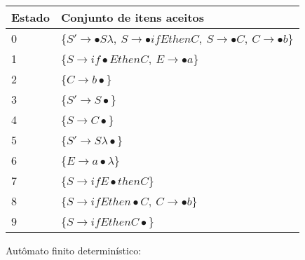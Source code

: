 \documentclass{article}
\begin{document}
\begin{table}[h]
\begin{tabular}{|l|l|}
\hline
Estado & Conjunto de itens aceitos \\ \hline
0 &   \{$S' \rightarrow \bullet S \lambda,\: S \rightarrow \bullet if E then C,\: S \rightarrow \bullet C,\: C \rightarrow \bullet b$\} \\\hline
1 & \{$S \rightarrow if \bullet E then C,\: E \rightarrow \bullet a$\}  \\ \hline
2 & \{$C \rightarrow b \bullet $\} \\ \hline
3 & \{$S' \rightarrow S \bullet $\} \\ \hline
4 & \{$S \rightarrow C \bullet $\} \\ \hline
5 & \{$S' \rightarrow S \lambda \bullet $\} \\ \hline
6 & \{$E \rightarrow a \bullet \lambda $\} \\ \hline
7 & \{$S \rightarrow if E \bullet then C$\} \\ \hline
8 & \{$S \rightarrow if E then \bullet C,\: C \rightarrow \bullet b$\} \\ \hline
9 & \{$S \rightarrow if E then C \bullet $\} \\ \hline
\end{tabular}
\end{table}
\newpage
Autômato finito determinístico:
\end{document}
